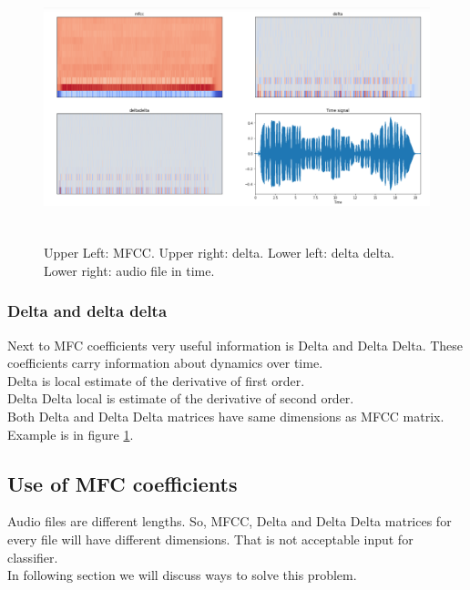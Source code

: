 \documentclass{article}
\begin{document}
\begin{figure}[!htb]
\includegraphics[width=15cm, height=7cm]{mdda}\\
\caption{Upper Left: MFCC. Upper right: delta. Lower left: delta delta. Lower right: audio file in time.}
\label{fig:mdda}
\centering
\end{figure}


\subsubsection{Delta and delta delta}
Next to MFC coefficients very useful information is Delta and Delta Delta. These coefficients carry information about
dynamics over time.\\
Delta is local estimate of the derivative of first order.\\
Delta Delta local is estimate of the derivative of second order.\\
Both Delta and Delta Delta matrices have same dimensions as MFCC matrix. Example is in figure \ref{fig:mdda}.\\

\subsection{Use of MFC coefficients}
Audio files are different lengths. So, MFCC, Delta and Delta Delta matrices for every file will have different dimensions. 
That is not acceptable input for classifier.\\
In following section we will discuss ways to solve this problem.\\
\end{document}
